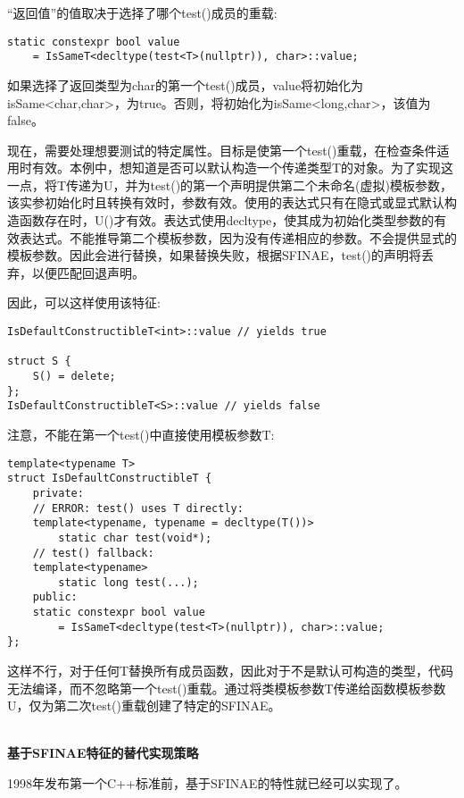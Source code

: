 “返回值”的值取决于选择了哪个test()成员的重载:

\begin{lstlisting}[style=styleCXX]
static constexpr bool value
	= IsSameT<decltype(test<T>(nullptr)), char>::value;
\end{lstlisting}

如果选择了返回类型为char的第一个test()成员，value将初始化为isSame<char,char>，为true。否则，将初始化为isSame<long,char>，该值为false。

现在，需要处理想要测试的特定属性。目标是使第一个test()重载，在检查条件适用时有效。本例中，想知道是否可以默认构造一个传递类型T的对象。为了实现这一点，将T传递为U，并为test()的第一个声明提供第二个未命名(虚拟)模板参数，该实参初始化时且转换有效时，参数有效。使用的表达式只有在隐式或显式默认构造函数存在时，U()才有效。表达式使用decltype，使其成为初始化类型参数的有效表达式。不能推导第二个模板参数，因为没有传递相应的参数。不会提供显式的模板参数。因此会进行替换，如果替换失败，根据SFINAE，test()的声明将丢弃，以便匹配回退声明。

因此，可以这样使用该特征:

\begin{lstlisting}[style=styleCXX]
IsDefaultConstructibleT<int>::value // yields true

struct S {
	S() = delete;
};
IsDefaultConstructibleT<S>::value // yields false
\end{lstlisting}

注意，不能在第一个test()中直接使用模板参数T:

\begin{lstlisting}[style=styleCXX]
template<typename T>
struct IsDefaultConstructibleT {
	private:
	// ERROR: test() uses T directly:
	template<typename, typename = decltype(T())>
		static char test(void*);
	// test() fallback:
	template<typename>
		static long test(...);
	public:
	static constexpr bool value
		= IsSameT<decltype(test<T>(nullptr)), char>::value;
};
\end{lstlisting}

这样不行，对于任何T替换所有成员函数，因此对于不是默认可构造的类型，代码无法编译，而不忽略第一个test()重载。通过将类模板参数T传递给函数模板参数U，仅为第二次test()重载创建了特定的SFINAE。

\hspace*{\fill} \\ %
\noindent
\textbf{基于SFINAE特征的替代实现策略}

1998年发布第一个C++标准前，基于SFINAE的特性就已经可以实现了。

